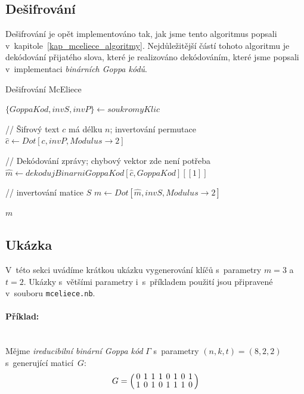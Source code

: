 \documentclass[thesis=M,czech,hidelinks]{FITthesis}[2012/06/26]
\newcommand{\0}{{\textcolor[gray]{0.75}{0}}}
\newenvironment{algoritmus}{
    \floatname{algorithm}{Algoritmus}
    \begin{algorithm}
}{\end{algorithm}}
\begin{document}
\subsection{Dešifrování}\label{kap_mceliece_desifrovani}

Dešifrování je opět implementováno tak, jak jsme tento algoritmus popsali
v~kapitole~\ref{kap_mceliece_algoritmy}. Nejdůležitější částí tohoto algoritmu
je dekódování přijatého slova, které je realizováno dekódováním, které jsme
popsali v~implementaci \emph{binárních Goppa kódů}.

\begin{algoritmus}[!ht]
    \caption{Dešifrování McEliece}
    \begin{algorithmic}[1]
        \State $ \{ GoppaKod, invS, invP \} \gets soukromyKlic $

        // Šifrový text $c$ má délku $n$; invertování permutace
        \State $ \hat{c} \gets Dot[ c, invP, Modulus\to2 ] $

        // Dekódování zprávy; chybový vektor zde není potřeba
        \State $ \hat{m} \gets dekodujBinarniGoppaKod[ \hat{c}, GoppaKod ][[1]] $

        // invertování matice $S$
        \State $ m \gets Dot[ \hat{m}, invS, Modulus\to2 ] $

        \State \Return $ m $
     \EndFunction
    \end{algorithmic}
\end{algoritmus}


\subsection{Ukázka}\label{kap_mceliece_ukazka}

V~této sekci uvádíme krátkou ukázku vygenerování klíčů s~parametry $m = 3$
a~$t = 2$. Ukázky s~většími parametry i~s~příkladem použití jsou připravené
v~souboru \texttt{mceliece.nb}.

\paragraph{Příklad:} \hfil \\
Mějme \emph{ireducibilní binární Goppa kód} $\Gamma$ s~parametry
$(n,k,t)=(8,2,2)$ s~generující maticí~$G$:
$$
\arraycolsep=2pt
\def\arraystretch{0.8}
    G = \left(
        \begin{array}{*{8}{c}}
            0 & 1 & 1 & 1 & 0 & 1 & 0 & 1 \\
            1 & 0 & 1 & 0 & 1 & 1 & 1 & 0 \\
        \end{array}
    \right)
$$
\end{document}
